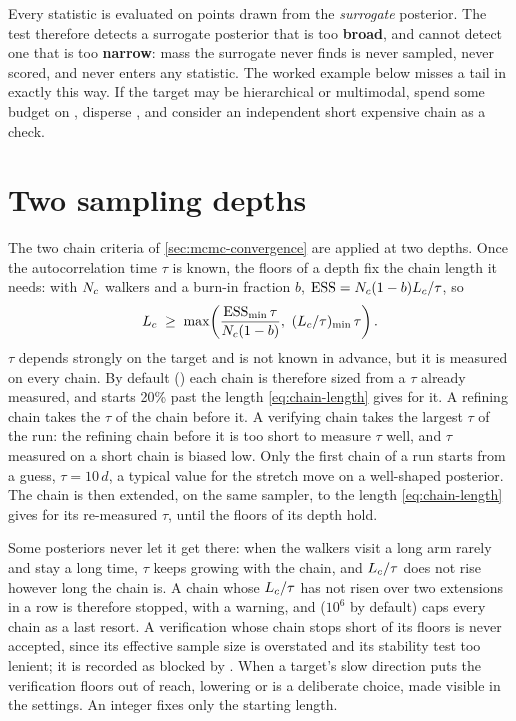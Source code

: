 \begin{cautionbox}
Every statistic is evaluated on points drawn from the \emph{surrogate} posterior. The test therefore
detects a surrogate posterior that is too \textbf{broad}, and cannot detect one that is too
\textbf{narrow}: mass the surrogate never finds is never sampled, never scored, and never enters any
statistic. The worked example below misses a tail in exactly this way. If the target may be
hierarchical or multimodal, spend some budget on , disperse
, and consider an independent short expensive chain as a check.
\end{cautionbox}

\section{Two sampling depths}
\label{sec:two-depths}

The two chain criteria of \cref{sec:mcmc-convergence} are applied at two depths. Once the
autocorrelation time $\tau$ is known, the floors of a depth fix the chain length it needs: with $N_c$
walkers and a burn-in fraction $b$, $\mathrm{ESS} = N_c(1-b)L_c/\tau$, so
\begin{equation}
  \Lc \;\ge\; \max\!\left(\frac{\ESS_{\min}\,\tau}{\Nc(1-b)},\ (\Lc/\tau)_{\min}\,\tau\right).
  \label{eq:chain-length}
\end{equation}
$\tau$ depends strongly on the target and is not known in advance, but it is measured on every chain.
By default () each chain is therefore sized from a $\tau$ already
measured, and starts 20\% past the length \cref{eq:chain-length} gives for it. A refining chain takes
the $\tau$ of the chain before it. A verifying chain takes the largest $\tau$ of the run: the
refining chain before it is too short to measure $\tau$ well, and $\tau$ measured on a short chain is
biased low. Only the first chain of a run starts from a guess, $\tau = 10\,d$, a typical value for
the stretch move on a well-shaped posterior. The chain is then extended, on the same sampler, to the
length \cref{eq:chain-length} gives for its re-measured $\tau$, until the floors of its depth hold.

Some posteriors never let it get there: when the walkers visit a long arm rarely and stay a long
time, $\tau$ keeps growing with the chain, and $L_c/\tau$ does not rise however long the chain is. A
chain whose $L_c/\tau$ has not risen over two extensions in a row is therefore stopped, with a
warning, and  ($10^6$ by default) caps every chain as a last resort. A
verification whose chain stops short of its floors is never accepted, since its effective sample
size is overstated and its stability test too lenient; it is recorded as blocked by
. When a target's slow direction puts the verification floors out of reach,
lowering  or  is a deliberate choice, made
visible in the settings. An integer  fixes only the starting length.

